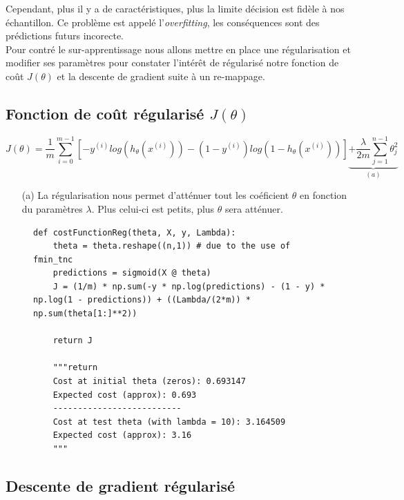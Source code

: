 Cependant, plus il y a de caractéristiques, plus la limite décision est fidèle à nos échantillon. Ce problème est appelé l'\textit{overfitting}, les conséquences sont des prédictions futurs 
incorecte. \\
Pour contré le sur-apprentissage nous allons mettre en place une régularisation et modifier ses paramètres pour constater l'intérêt de régularisé notre fonction de coût $J(\theta)$ et 
la descente de gradient suite à un re-mappage.

\subsection{Fonction de coût régularisé $J(\theta)$}

\begin{equation}\label{eq:cout-reg}
    J(\theta) = \frac{1}{m} \sum_{i=0}^{m-1}[-y^{(i)} log(h_\theta(x^{(i)})) - (1-y^{(i)}) log(1-h_\theta(x^{(i)}))] \underbrace{+ \frac{\lambda}{2m} \sum_{j=1}^{n-1} \theta_j^2}_{(a)}
\end{equation}

\begin{itemize}
    \item [(a)] La régularisation nous permet d'atténuer tout les coéficient $\theta$ en fonction du paramètres $\lambda$. Plus celui-ci est petits, plus $\theta$ sera atténuer.
\end{itemize}

\begin{figure}[!h]
\begin{verbatim}
def costFunctionReg(theta, X, y, Lambda):
    theta = theta.reshape((n,1)) # due to the use of fmin_tnc
    predictions = sigmoid(X @ theta)
    J = (1/m) * np.sum(-y * np.log(predictions) - (1 - y) * np.log(1 - predictions)) + ((Lambda/(2*m)) * np.sum(theta[1:]**2))
          
    return J

    """return 
    Cost at initial theta (zeros): 0.693147
    Expected cost (approx): 0.693
    -------------------------- 
    Cost at test theta (with lambda = 10): 3.164509
    Expected cost (approx): 3.16
    """
\end{verbatim}   
\end{figure}
    


\subsection{Descente de gradient régularisé}

